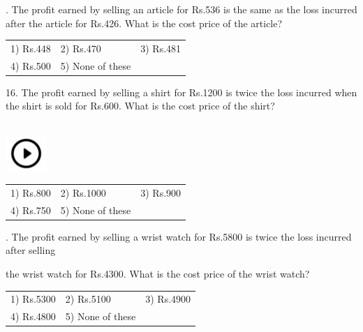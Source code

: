 \documentclass{article}
\begin{document}
	\noindent 
	
	\noindent 
	
	\noindent 
	
	. The profit earned by selling an article for Rs.536 is the same as the loss incurred after the article for Rs.426. What is the cost price of the article?
	
	\noindent  
	\begin{tabular}{p{1.7in} p{1.6in} p{1.6in}} \\ 
 1) Rs.448                 & 2) Rs.470          & 3) Rs.481          \\
4) Rs.500          & 5) None of these  \\
\end{tabular}
	
	\noindent 
	
	\noindent 
	
	\noindent 
	
	\noindent 
	
	16. The profit earned by selling a shirt for Rs.1200 is twice the loss incurred when the shirt is sold for Rs.600. What is the cost price of the shirt?
	
	\noindent \noindent \\ \includegraphics*[width=0.61in, height=0.52in]{images/image1} 
	\begin{tabular}{p{1.7in} p{1.6in} p{1.6in}} \\ 
 1) Rs.800                 & 2) Rs.1000        & 3) Rs.900          \\
4) Rs.750          & 5) None of these  \\
\end{tabular}
	
	\noindent 
	
	. The profit earned by selling a wrist watch for Rs.5800 is twice the loss incurred after selling
	
	\noindent 
	
	\noindent the wrist watch for Rs.4300. What is the cost price of the wrist watch?
	
	\noindent 
	
	\noindent  
	\begin{tabular}{p{1.7in} p{1.6in} p{1.6in}} \\ 
 1) Rs.5300               & 2) Rs.5100        & 3) Rs.4900        \\
4) Rs.4800        & 5) None of these  \\
\end{tabular}
	
\end{document}
